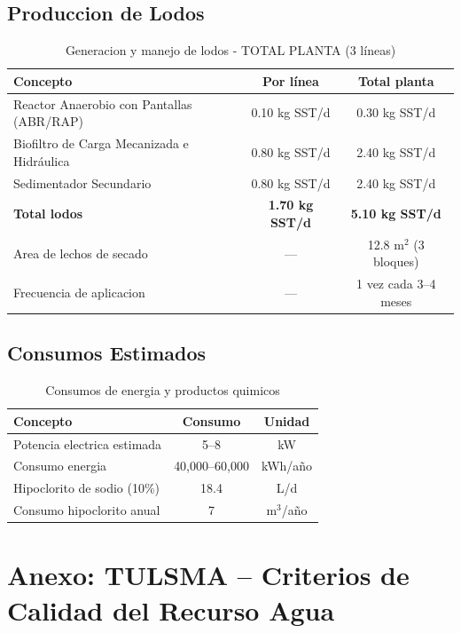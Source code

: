 \documentclass[12pt,a4paper]{article}
\begin{document}
\subsection{Produccion de Lodos}

\begin{table}[H]
\centering
\caption{Generacion y manejo de lodos - TOTAL PLANTA (3 líneas)}
\begin{tabular}{p{6cm}cc}
\toprule
\textbf{Concepto} & \textbf{Por línea} & \textbf{Total planta} \\
\midrule
Reactor Anaerobio con Pantallas (ABR/RAP) & 0.10 kg SST/d & 0.30 kg SST/d \\
Biofiltro de Carga Mecanizada e Hidráulica & 0.80 kg SST/d & 2.40 kg SST/d \\
Sedimentador Secundario & 0.80 kg SST/d & 2.40 kg SST/d \\
\midrule
\textbf{Total lodos} & \textbf{1.70 kg SST/d} & \textbf{5.10 kg SST/d} \\
Area de lechos de secado & --- & 12.8 m$^2$ (3 bloques) \\
Frecuencia de aplicacion & --- & 1 vez cada 3--4 meses \\
\bottomrule
\end{tabular}
\end{table}

\subsection{Consumos Estimados}

\begin{table}[H]
\centering
\caption{Consumos de energia y productos quimicos}
\begin{tabular}{lcc}
\toprule
\textbf{Concepto} & \textbf{Consumo} & \textbf{Unidad} \\
\midrule
Potencia electrica estimada & 5--8 & kW \\
Consumo energia & 40,000--60,000 & kWh/a\~no \\
Hipoclorito de sodio (10\%) & 18.4 & L/d \\
Consumo hipoclorito anual & 7 & m$^3$/a\~no \\
\bottomrule
\end{tabular}
\end{table}




\newpage




\newpage
\appendix
\section{Anexo: TULSMA -- Criterios de Calidad del Recurso Agua}
\label{app:tulsma}
\end{document}
